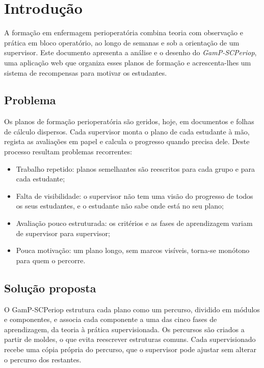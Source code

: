 \chapter{Introdução}

A formação em enfermagem perioperatória combina teoria com observação e prática em bloco operatório, ao longo de semanas e sob a orientação de um supervisor. Este documento apresenta a análise e o desenho do \emph{GamP-SCPeriop}, uma aplicação web que organiza esses planos de formação e acrescenta-lhes um sistema de recompensas para motivar os estudantes.

\section{Problema}

Os planos de formação perioperatória são geridos, hoje, em documentos e folhas de cálculo dispersos. Cada supervisor monta o plano de cada estudante à mão, regista as avaliações em papel e calcula o progresso quando precisa dele. Deste processo resultam problemas recorrentes:

\begin{itemize}
    \item Trabalho repetido: planos semelhantes são reescritos para cada grupo e para cada estudante;
    \item Falta de visibilidade: o supervisor não tem uma visão do progresso de todos os seus estudantes, e o estudante não sabe onde está no seu plano;
    \item Avaliação pouco estruturada: os critérios e as fases de aprendizagem variam de supervisor para supervisor;
    \item Pouca motivação: um plano longo, sem marcos visíveis, torna-se monótono para quem o percorre.
\end{itemize}

\section{Solução proposta}

O GamP-SCPeriop estrutura cada plano como um \gls{percurso}, dividido em módulos e \glspl{componente}, e associa cada componente a uma das cinco fases de aprendizagem, da teoria à prática supervisionada. Os percursos são criados a partir de \glspl{molde}, o que evita reescrever estruturas comuns. Cada \gls{supervisionado} recebe uma cópia própria do percurso, que o supervisor pode ajustar sem alterar o percurso dos restantes.

